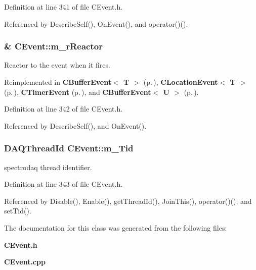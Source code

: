 Definition at line 341 of file CEvent.h.

Referenced by Describe\-Self(), On\-Event(), and operator()().
\subsubsection{\& CEvent::m\_\-r\-Reactor\hspace{0.3cm}{\tt  [private]}}\label{classCEvent_o5}


Reactor to the event when it fires.



Reimplemented in {\bf CBuffer\-Event$<$ T $>$} {\rm (p.\,\pageref{classCBufferEvent_o3})}, {\bf CLocation\-Event$<$ T $>$} {\rm (p.\,\pageref{classCLocationEvent_o2})}, {\bf CTimer\-Event} {\rm (p.\,\pageref{classCTimerEvent_o1})}, and {\bf CBuffer\-Event$<$ U $>$} {\rm (p.\,\pageref{classCBufferEvent_o3})}.

Definition at line 342 of file CEvent.h.

Referenced by Describe\-Self(), and On\-Event().
\subsubsection{\setlength{\rightskip}{0pt plus 5cm}DAQThread\-Id CEvent::m\_\-Tid\hspace{0.3cm}{\tt  [private]}}\label{classCEvent_o6}


spectrodaq thread identifier.



Definition at line 343 of file CEvent.h.

Referenced by Disable(), Enable(), get\-Thread\-Id(), Join\-This(), operator()(), and set\-Tid().

The documentation for this class was generated from the following files:\begin{CompactItemize}
\item 
{\bf CEvent.h}\item 
{\bf CEvent.cpp}\end{CompactItemize}
